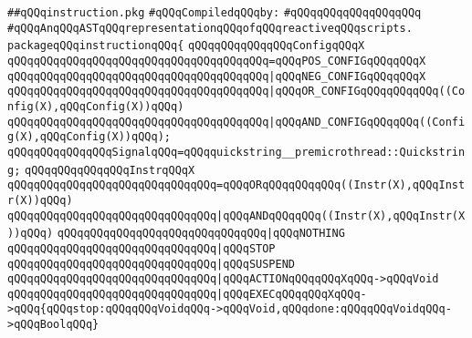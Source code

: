 \label{src/lib/reactive/instruction.pkg}
\verb|##qQQqinstruction.pkg|\newline
\newline
\verb|#qQQqCompiledqQQqby:|\newline
\verb|#qQQqqQQqqQQqqQQqqQQq|\newline
\newline
\verb|#qQQqAnqQQqASTqQQqrepresentationqQQqofqQQqreactiveqQQqscripts.|\newline
\newline
\verb|packageqQQqinstructionqQQq{|\newline
\newline
\verb|qQQqqQQqqQQqqQQqConfigqQQqX|\newline
\verb|qQQqqQQqqQQqqQQqqQQqqQQqqQQqqQQqqQQqqQQq=qQQqPOS_CONFIGqQQqqQQqX|\newline
\verb|qQQqqQQqqQQqqQQqqQQqqQQqqQQqqQQqqQQqqQQq|\verb#|qQQqNEG_CONFIGqQQqqQQqX#\newline
\verb|qQQqqQQqqQQqqQQqqQQqqQQqqQQqqQQqqQQqqQQq|\verb#|qQQqOR_CONFIGqQQqqQQqqQQq((Config(X),qQQqConfig(X))qQQq)#\newline
\verb|qQQqqQQqqQQqqQQqqQQqqQQqqQQqqQQqqQQqqQQq|\verb#|qQQqAND_CONFIGqQQqqQQq((Config(X),qQQqConfig(X))qQQq);#\newline
\newline
\verb|qQQqqQQqqQQqqQQqSignalqQQq=qQQqquickstring__premicrothread::Quickstring;|\newline
\newline
\verb|qQQqqQQqqQQqqQQqInstrqQQqX|\newline
\verb|qQQqqQQqqQQqqQQqqQQqqQQqqQQqqQQq=qQQqORqQQqqQQqqQQq((Instr(X),qQQqInstr(X))qQQq)|\newline
\verb|qQQqqQQqqQQqqQQqqQQqqQQqqQQqqQQq|\verb#|qQQqANDqQQqqQQq((Instr(X),qQQqInstr(X))qQQq)#\newline
\verb|qQQqqQQqqQQqqQQqqQQqqQQqqQQqqQQq|\verb#|qQQqNOTHING#\newline
\verb|qQQqqQQqqQQqqQQqqQQqqQQqqQQqqQQq|\verb#|qQQqSTOP#\newline
\verb|qQQqqQQqqQQqqQQqqQQqqQQqqQQqqQQq|\verb#|qQQqSUSPEND#\newline
\verb|qQQqqQQqqQQqqQQqqQQqqQQqqQQqqQQq|\verb#|qQQqACTIONqQQqqQQqXqQQq->qQQqVoid#\newline
\verb|qQQqqQQqqQQqqQQqqQQqqQQqqQQqqQQq|\verb#|qQQqEXECqQQqqQQqXqQQq->qQQq{qQQqstop:qQQqqQQqVoidqQQq->qQQqVoid,qQQqdone:qQQqqQQqVoidqQQq->qQQqBoolqQQq}#\newline
